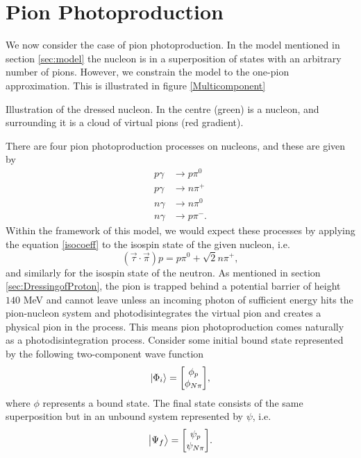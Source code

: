 \chapter{Pion Photoproduction}\label{sec:PionPhotoproduction}
We now consider the case of pion photoproduction. In the model mentioned in section \ref{sec:model} the nucleon is in a superposition of states with an arbitrary number of pions. However, we constrain the model to the one-pion approximation. This is illustrated in figure \ref{Multicomponent}
\begin{marginfigure}
	\centering
	
	\caption{Illustration of the dressed nucleon. In the centre (green) is a nucleon, and surrounding it is a cloud of virtual pions (red gradient). }
	\label{Multicomponent}
\end{marginfigure}
There are four pion photoproduction processes on nucleons, and these are given by
\begin{align}
	p \gamma & \rightarrow p \pi^0 \label{photonew1}\\
	p \gamma & \rightarrow n \pi^+ \label{photonew2}\\
	n \gamma & \rightarrow n \pi^0 \label{photonew3}\\
	n \gamma & \rightarrow p \pi^- \label{photonew4}.
\end{align}
Within the framework of this model, we would expect these processes by applying the equation \eqref{isocoeff} to the isospin state of the given nucleon, i.e.
\begin{equation} \label{isovectorex}
	(\vec{\tau}\cdot\vec{\pi}) p = p\pi^0 + \sqrt{2}n\pi^+,
\end{equation}
and similarly for the isospin state of the neutron. As mentioned in section \ref{sec:DressingofProton}, the pion is trapped behind a potential barrier of height $140$ MeV and cannot leave unless an incoming photon of sufficient energy hits the pion-nucleon system and photodisintegrates the virtual pion and creates a physical pion in the process. This means pion photoproduction comes naturally as a photodisintegration process. Consider some initial bound state represented by the following two-component wave function
\begin{equation} \label{phii}
	\ket{\Phi_i} = \mqty[\phi_p \\ \phi_{N\pi}],
\end{equation}
where $\phi$ represents a bound state. The final state consists of the same superposition but in an unbound system represented by $\psi$, i.e.
\begin{equation} \label{psif}
	\ket{\Psi_f} = \mqty[\psi_p \\ \psi_{N\pi}].
\end{equation}
